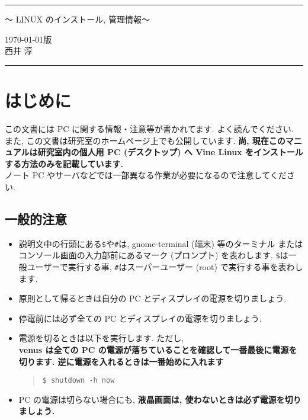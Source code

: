 \documentclass{jarticle}
\begin{document}
\pagestyle{empty}
\rule{\linewidth}{0.3pt}
\begin{center}
  {\Large 〜 LINUX のインストール, 管理情報〜}
\end{center}
\begin{flushright}
\today 版\\
西井 淳
\end{flushright}
\rule{\linewidth}{0.3pt} 
\newpage
{\small
\tableofcontents
}

\newpage


\pagestyle{fancy}

\section{はじめに}
この文書には PC に関する情報・注意等が書かれてます. よく読んでください.
また, この文書は研究室のホームページ上でも公開しています.
\textbf{尚, 現在このマニュアルは研究室内の個人用 PC (デスクトップ) へ
Vine Linux をインストールする方法のみを記載しています. }\\
ノート PC やサーバなどでは一部異なる作業が必要になるので注意してください.

\subsection{一般的注意}

\begin{itemize}
	\item 説明文中の行頭にある\verb|$|や\verb|#|は, gnome-terminal (端末) 等のターミナル
	      またはコンソール画面の入力部前にあるマーク (プロンプト) を表わします.
	      \verb|$|は一般ユーザーで実行する事, \verb|#|はスーパーユーザー (root)
	      で実行する事を表わします.
	\item 原則として帰るときは自分の PC とディスプレイの電源を切りましょう.
	\item 停電前には必ず全ての PC とディスプレイの電源を切りましょう.
	\item 電源を切るときは以下を実行します. ただし, \\
	      \textbf{venus は全ての PC の電源が落ちていることを確認して一番最後に電源を切ります.
	      逆に電源を入れるときは一番始めに入れます}
		\begin{quote}
\begin{verbatim}
$ shutdown -h now
\end{verbatim}
		\end{quote}
	\item PC の電源は切らない場合にも, \textbf{液晶画面は, 使わないときは必ず電源を切りましょう. }
\end{itemize}
\end{document}
